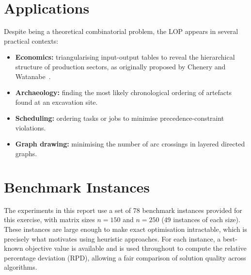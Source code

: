 \section{Applications}

Despite being a theoretical combinatorial problem, the LOP appears in several
practical contexts:
\begin{itemize}
    \item \textbf{Economics:} triangularising input-output tables to reveal the
    hierarchical structure of production sectors, as originally proposed by
    Chenery and Watanabe~\cite{CheWat58}.
    \item \textbf{Archaeology:} finding the most likely chronological ordering
    of artefacts found at an excavation site.
    \item \textbf{Scheduling:} ordering tasks or jobs to minimise
    precedence-constraint violations.
    \item \textbf{Graph drawing:} minimising the number of arc crossings in
    layered directed graphs.
\end{itemize}

\section{Benchmark Instances}

The experiments in this report use a set of 78 benchmark instances provided
for this exercise, with matrix sizes $n = 150$ and $n = 250$ (49 instances of
each size). These instances are large enough to make exact optimisation
intractable, which is precisely what motivates using heuristic approaches.
For each instance, a best-known objective value is available and is used
throughout to compute the relative percentage deviation (RPD), allowing a
fair comparison of solution quality across algorithms.
